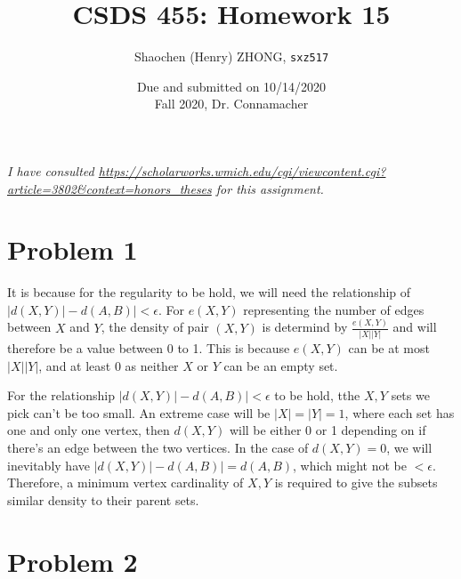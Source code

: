 \documentclass[11pt]{article}
\newcommand{\ilc}{\texttt}
\begin{document}
\title{\textbf{CSDS 455: Homework 15}}

\author{Shaochen (Henry) ZHONG, \ilc{sxz517}}
\date{Due and submitted on 10/14/2020 \\ Fall 2020, Dr. Connamacher}
\maketitle

\textit{I have consulted \url{https://scholarworks.wmich.edu/cgi/viewcontent.cgi?article=3802&context=honors_theses} for this assignment.}

\section*{Problem 1}

It is because for the regularity to be hold, we will need the relationship of $|d(X, Y)| - d(A, B)| < \epsilon$. For $e(X, Y)$ representing the number of edges between $X$ and $Y$, the density of pair $(X, Y)$ is determind by $\frac{e(X, Y)}{|X||Y|}$ and will therefore be a value between 0 to 1. This is because $e(X, Y)$ can be at most $|X||Y|$, and at least $0$ as neither $X$ or $Y$ can be an empty set.

For the relationship $|d(X, Y)| - d(A, B)| < \epsilon$ to be hold, tthe $X, Y$ sets we pick can't be too small. An extreme case will be $|X| = |Y| = 1$, where each set has one and only one vertex, then $d(X, Y)$ will be either 0 or 1 depending on if there's an edge between the two vertices. In the case of $d(X, Y) = 0$, we will inevitably have $|d(X, Y)| - d(A, B)| = d(A, B)$, which might not be $< \epsilon$. Therefore, a minimum vertex cardinality of $X, Y$ is required to give the subsets similar density to their parent sets.


\section*{Problem 2}



%
% 
% 
\end{document}
